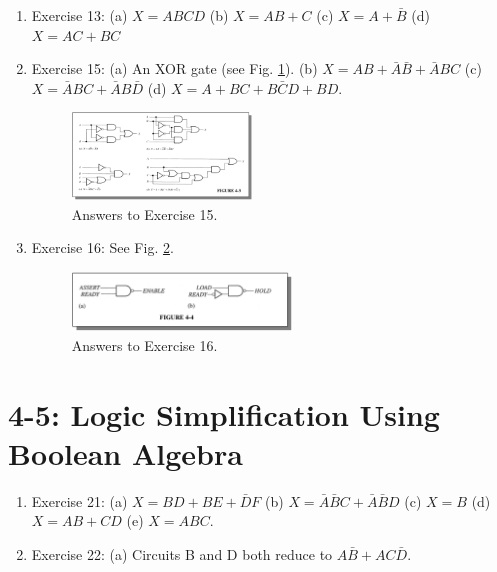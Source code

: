 \documentclass[10pt]{article}
\begin{document}
\begin{enumerate}
\item Exercise 13: (a) $X = ABCD$ (b) $X = AB+C$ (c) $X = A+\bar{B}$ (d) $X = AC+BC$
\item Exercise 15: (a) An XOR gate (see Fig. \ref{fig:ex15}). (b) $X = AB+\bar{A}\bar{B}+\bar{A}BC$ (c) $X = \bar{A}BC+\bar{A}B\bar{D}$ (d) $X = A+BC+B\bar{C}D+BD$.
\begin{figure}[hb]
\centering
\includegraphics[width=0.45\textwidth]{ex15.png}
\caption{\label{fig:ex15} Answers to Exercise 15.}
\end{figure}
\item Exercise 16: See Fig. \ref{fig:ex16}.
\begin{figure}[ht]
\centering
\includegraphics[width=0.55\textwidth]{ex16.png}
\caption{\label{fig:ex16} Answers to Exercise 16.}
\end{figure}
\end{enumerate}

\section{4-5: Logic Simplification Using Boolean Algebra}

\begin{enumerate}
\item Exercise 21: (a) $X = BD + BE + \bar{D}F$ (b) $X = \bar{A}\bar{B}C + \bar{A}\bar{B}D$ (c) $X = B$ (d) $X = AB + CD$ (e) $X = ABC$.
\item Exercise 22: (a) Circuits B and D both reduce to $A\bar{B} + AC\bar{D}$.
\end{enumerate}
\end{document}
